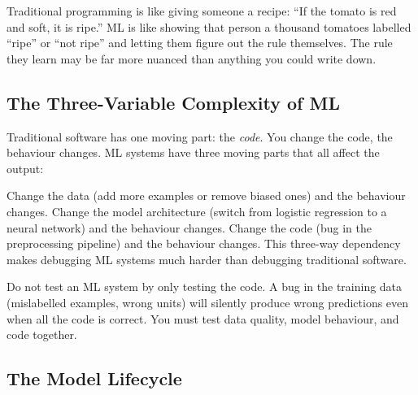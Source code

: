 \documentclass[a4paper,11pt]{article}
\begin{document}
\begin{intuition}
Traditional programming is like giving someone a recipe: ``If the tomato is red and soft, it is ripe.'' ML is like showing that person a thousand tomatoes labelled ``ripe'' or ``not ripe'' and letting them figure out the rule themselves. The rule they learn may be far more nuanced than anything you could write down.
\end{intuition}

\subsection{The Three-Variable Complexity of ML}

Traditional software has one moving part: the \emph{code}. You change the code, the behaviour changes. ML systems have three moving parts that all affect the output:

\begin{center}
\end{center}

Change the data (add more examples or remove biased ones) and the behaviour changes. Change the model architecture (switch from logistic regression to a neural network) and the behaviour changes. Change the code (bug in the preprocessing pipeline) and the behaviour changes. This three-way dependency makes debugging ML systems much harder than debugging traditional software.

\begin{watchout}
Do not test an ML system by only testing the code. A bug in the training data (mislabelled examples, wrong units) will silently produce wrong predictions even when all the code is correct. You must test data quality, model behaviour, and code together.
\end{watchout}

\subsection{The Model Lifecycle}
\end{document}
